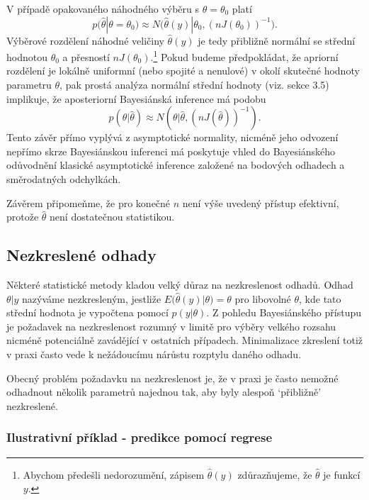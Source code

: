 V případě opakovaného náhodného výběru s $\theta = \theta_0$ platí
\begin{equation}
p \big(\hat{\theta}|\theta = \theta_0 \big) \approx N\big(\hat{\theta}(y)|\theta_0, (nJ(\theta_0))^{-1}\big).
\end{equation}
Výběrové rozdělení náhodné veličiny $\hat{\theta}(y)$ je tedy přibližně normální se střední hodnotou $\theta_0$ a přesností $nJ(\theta_0)$.\footnote{Abychom předešli nedorozumění, zápisem $\hat{\theta}(y)$ zdůrazňujeme, že $\hat{\theta}$ je funkcí $y$.} Pokud budeme předpokládat, že apriorní rozdělení je lokálně uniformní (nebo spojité a nenulové) v okolí skutečné hodnoty parametru $\theta$, pak prostá analýza normální střední hodnoty (viz. sekce 3.5) implikuje, že aposteriorní Bayesiánská inference má podobu
\begin{equation}
p(\theta | \hat{\theta}) \approx N(\theta | \hat{\theta}, (nJ(\hat{\theta}))^{-1}).
\end{equation}
Tento závěr přímo vyplývá z asymptotické normality, nicméně jeho odvození nepřímo skrze Bayesiánskou inferenci má poskytuje vhled do Bayesiánského odůvodnění klasické asymptotické inference založené na bodových odhadech a směrodatných odchylkách.

Závěrem připomeňme, že pro konečné $n$ není výše uvedený přístup efektivní, protože $\hat{\theta}$ není dostatečnou statistikou.

\subsection{Nezkreslené odhady}

Některé statistické metody kladou velký důraz na nezkreslenost odhadů. Odhad $\theta | y$ nazýváme nezkresleným, jestliže $E\big(\hat{\theta}(y)|\theta\big) = \theta$ pro libovolné $\theta$, kde tato střední hodnota je vypočtena pomocí $p(y|\theta)$. Z pohledu Bayesiánského přístupu je požadavek na nezkreslenost rozumný v limitě pro výběry velkého rozsahu nicméně potenciálně zavádějící v ostatních případech. Minimalizace zkreslení totiž v praxi často vede k nežádoucímu nárůstu rozptylu daného odhadu.

Obecný problém požadavku na nezkreslenost je, že v praxi je často nemožné odhadnout několik parametrů najednou tak, aby byly alespoň `přibližně' nezkreslené.

\subsubsection{Ilustrativní příklad - predikce pomocí regrese}

